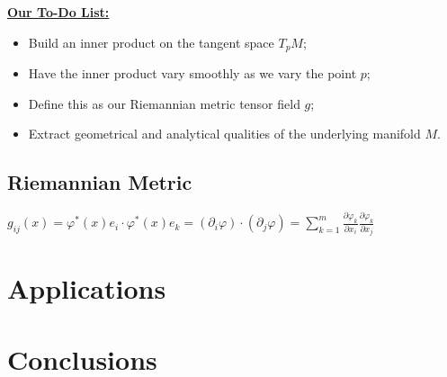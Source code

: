 \documentclass[UKenglish]{beamer}
\begin{document}
\begin{frame}{}
\vfill
\textbf{\underline{Our To-Do List:}}
\begin{itemize}
	\item Build an inner product on the tangent space $T_pM$;
	\pause
	\item Have the inner product vary smoothly as we vary the point $p$;
	\pause
	\item Define this as our Riemannian metric tensor field $g$;
	\pause
	\item Extract geometrical and analytical qualities of the underlying manifold $M$.
\end{itemize}
\vfill
\end{frame}


\subsection{Riemannian Metric}

\begin{frame}{}
\vfill
$g_{ij}(x) = \varphi^*(x)e_i \cdot \varphi^*(x)e_k = (\partial_i \varphi)\cdot (\partial_j \varphi) = \sum_{k=1}^m \frac{\partial \varphi_k}{\partial x_i}\frac{\partial \varphi_k}{\partial x_j}$
\vfill
\end{frame}

\begin{frame}{}

\end{frame}







\section{Applications}









\section{Conclusions}
\end{document}

